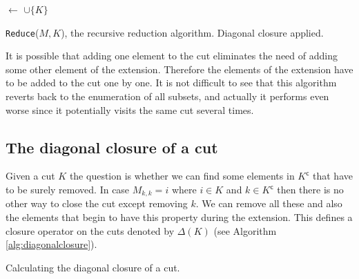 \documentclass{article}
\theoremstyle{plain}
\theoremstyle{definition}
\newcommand{\compl}{\mathsf{c}}
\begin{document}
\begin{algorithm}[t]
\BlankLine
\Name{}

\Visited $\leftarrow$ \Visited$\cup \{K\}$\;
\caption{\texttt{Reduce}($M,K$), the recursive reduction algorithm.  Diagonal closure applied.}
\label{alg:basicrecursive}
\end{algorithm}
It is possible that adding one element to the cut eliminates the need of adding some other element of the extension.
Therefore the elements of the extension have to be added to the cut one by one. It is not difficult to see that this algorithm reverts back to the enumeration of all subsets, and actually it performs even worse since it potentially visits the same cut several times. 

\subsection{The diagonal closure of a cut}
Given a cut $K$ the question is whether we can find some elements in $K^\compl$ that have to be surely removed. In case $M_{k,k}=i$ where $i\in K$ and $k\in K^\compl$ then there is no other way to close the cut except removing $k$. We can remove all these and also the elements that begin to have this property during the extension. This defines a closure operator on the cuts denoted by $\Delta(K)$ (see Algorithm \ref{alg:diagonalclosure}).  
\begin{algorithm}[t]

\caption{Calculating the diagonal closure of a cut.}
\label{alg:diagonalclosure}
\end{algorithm}
\end{document}
